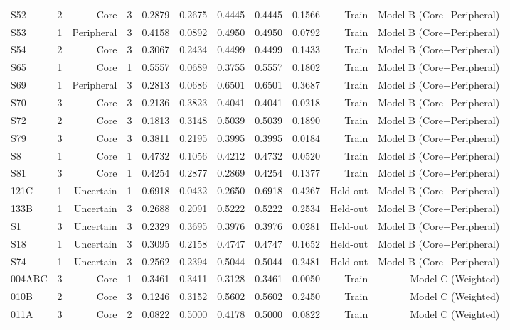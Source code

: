 {\begin{longtable}{lrrrrrrrrrr}
  S52 & 2 & Core & 3 & 0.2879 & 0.2675 & 0.4445 & 0.4445 & 0.1566 & Train & Model B (Core+Peripheral) \\
  S53 & 1 & Peripheral & 3 & 0.4158 & 0.0892 & 0.4950 & 0.4950 & 0.0792 & Train & Model B (Core+Peripheral) \\
  S54 & 2 & Core & 3 & 0.3067 & 0.2434 & 0.4499 & 0.4499 & 0.1433 & Train & Model B (Core+Peripheral) \\
  S65 & 1 & Core & 1 & 0.5557 & 0.0689 & 0.3755 & 0.5557 & 0.1802 & Train & Model B (Core+Peripheral) \\
  S69 & 1 & Peripheral & 3 & 0.2813 & 0.0686 & 0.6501 & 0.6501 & 0.3687 & Train & Model B (Core+Peripheral) \\
  S70 & 3 & Core & 3 & 0.2136 & 0.3823 & 0.4041 & 0.4041 & 0.0218 & Train & Model B (Core+Peripheral) \\
  S72 & 2 & Core & 3 & 0.1813 & 0.3148 & 0.5039 & 0.5039 & 0.1890 & Train & Model B (Core+Peripheral) \\
  S79 & 3 & Core & 3 & 0.3811 & 0.2195 & 0.3995 & 0.3995 & 0.0184 & Train & Model B (Core+Peripheral) \\
  S8 & 1 & Core & 1 & 0.4732 & 0.1056 & 0.4212 & 0.4732 & 0.0520 & Train & Model B (Core+Peripheral) \\
  S81 & 3 & Core & 1 & 0.4254 & 0.2877 & 0.2869 & 0.4254 & 0.1377 & Train & Model B (Core+Peripheral) \\
  121C & 1 & Uncertain & 1 & 0.6918 & 0.0432 & 0.2650 & 0.6918 & 0.4267 & Held-out & Model B (Core+Peripheral) \\
  133B & 1 & Uncertain & 3 & 0.2688 & 0.2091 & 0.5222 & 0.5222 & 0.2534 & Held-out & Model B (Core+Peripheral) \\
  S1 & 3 & Uncertain & 3 & 0.2329 & 0.3695 & 0.3976 & 0.3976 & 0.0281 & Held-out & Model B (Core+Peripheral) \\
  S18 & 1 & Uncertain & 3 & 0.3095 & 0.2158 & 0.4747 & 0.4747 & 0.1652 & Held-out & Model B (Core+Peripheral) \\
  S74 & 1 & Uncertain & 3 & 0.2562 & 0.2394 & 0.5044 & 0.5044 & 0.2481 & Held-out & Model B (Core+Peripheral) \\
  004ABC & 3 & Core & 1 & 0.3461 & 0.3411 & 0.3128 & 0.3461 & 0.0050 & Train & Model C (Weighted) \\
  010B & 2 & Core & 3 & 0.1246 & 0.3152 & 0.5602 & 0.5602 & 0.2450 & Train & Model C (Weighted) \\
  011A & 3 & Core & 2 & 0.0822 & 0.5000 & 0.4178 & 0.5000 & 0.0822 & Train & Model C (Weighted) \\

\end{longtable}}
